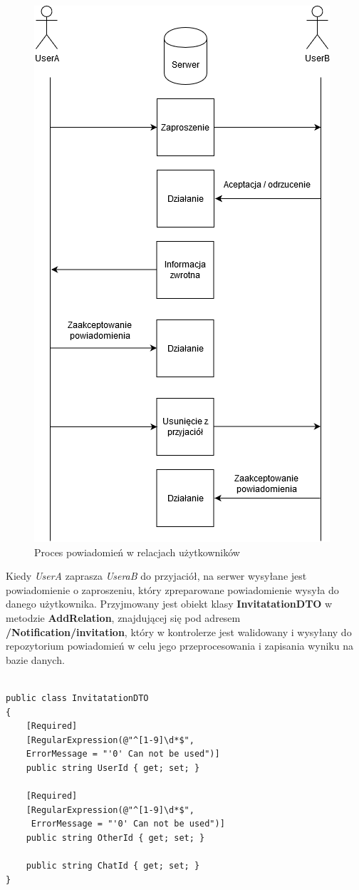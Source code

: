 \documentclass[12pt,a4paper]{article}
\begin{document}
\begin{figure}[H]
	\centering
	\includegraphics[width=0.7\linewidth]{PowiadomieniaUser}
	\caption{Proces powiadomień w relacjach użytkowników}
	\label{fig:powiadomieniauser}
\end{figure}

Kiedy \textit{UserA} zaprasza \textit{UseraB} do przyjaciół, na serwer wysyłane jest powiadomienie o zaproszeniu, który zpreparowane powiadomienie wysyła do danego użytkownika. Przyjmowany jest obiekt klasy \textbf{InvitatationDTO} w metodzie \textbf{AddRelation}, znajdującej się pod adresem \textbf{/Notification/invitation}, który w kontrolerze jest walidowany i wysyłany do repozytorium powiadomień w celu jego przeprocesowania i zapisania wyniku na bazie danych.

\begin{lstlisting}[caption={Implementacja klasy InvitatationDTO}]

public class InvitatationDTO
{
	[Required]
	[RegularExpression(@"^[1-9]\d*$", 
	ErrorMessage = "'0' Can not be used")]
	public string UserId { get; set; }
	
	[Required]
	[RegularExpression(@"^[1-9]\d*$",
	 ErrorMessage = "'0' Can not be used")]
	public string OtherId { get; set; }
	
	public string ChatId { get; set; }
}

\end{lstlisting}
\end{document}
